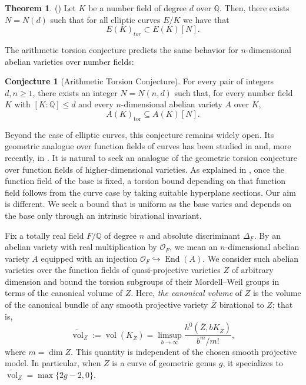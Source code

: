 \documentclass[12 pt]{amsart}
\theoremstyle{definition}
\newtheorem*{theorem*}{Theorem}
\newtheorem*{Conjecture*}{Conjecture}
\newcommand{\Q}{\mathbb{Q}} %
\begin{document}
\begin{theorem*}(\cite{merel1996bornes,kamienny1992torsion}) Let $K$ be a number field of degree $d$ over $\Q.$ Then, there exists $N=N(d)$ such that for all elliptic curves $E/K$ we have that 
    \[
        E(K)_{tor}\subset E(K)[N]. 
    \]
\end{theorem*}
The arithmetic torsion conjecture predicts the same behavior for $n$-dimensional abelian varieties over number fields: 

\begin{Conjecture*}[Arithmetic Torsion Conjecture]
For every pair of integers \(d,n\geq 1\), there exists an integer
\(N=N(n,d)\) such that, for every number field \(K\) with
\([K:\mathbb{Q}]\leq d\) and every \(n\)-dimensional abelian variety \(A\)
over \(K\),
\[
A(K)_{\mathrm{tor}}\subseteq A(K)[N].
\]
\end{Conjecture*}
Beyond the case of elliptic curves, this conjecture remains widely open. Its
geometric analogue over function fields of curves has been studied in
\cite{cadoret2011weak,cadoret2012uniform,bakker2018geometric} and, more
recently, in \cite{looperYap2026,gaoGu2026}. It is natural to seek an analogue of the geometric torsion conjecture over
function fields of higher-dimensional varieties. As explained in \cite[Appendix A]{cadoret2011weak}, once the function field of the base is fixed, a torsion bound depending on that function field follows from the curve case by taking suitable hyperplane sections. Our aim is different. We seek a bound that is uniform as the base varies and depends on the base only through an intrinsic  birational invariant.

Fix a totally
real field \(F/\mathbb{Q}\) of degree \(n\) and absolute discriminant \(\Delta_F\). By an abelian variety with real
multiplication by \(\mathcal{O}_F\), we mean an \(n\)-dimensional abelian
variety \(A\) equipped with an injection $\mathcal{O}_F\hookrightarrow\operatorname{End}(A).$
We consider such abelian varieties over the function fields of
quasi-projective varieties \(Z\) of arbitrary dimension and bound the torsion
subgroups of their Mordell--Weil groups in terms of the canonical volume of
\(Z\). Here, \emph{the canonical volume} of \(Z\) is the volume of the
canonical bundle of any smooth projective variety \(\overline{Z}\) birational
to \(Z\); that is,
\[
\widetilde{\operatorname{vol}}_{Z}
:=
\operatorname{vol}(K_{\overline{Z}})
=
\limsup_{b\to\infty}
\frac{h^0(\overline{Z},bK_{\overline{Z}})}{b^m/m!},
\]
 where \(m=\dim Z\). This quantity is independent of the chosen smooth projective model. In particular,  when
\(Z\) is a curve of geometric genus \(g\), it specializes to
\(
\widetilde{\operatorname{vol}}_{Z}
=
\max\{2g-2,0\}.
\)
\end{document}
